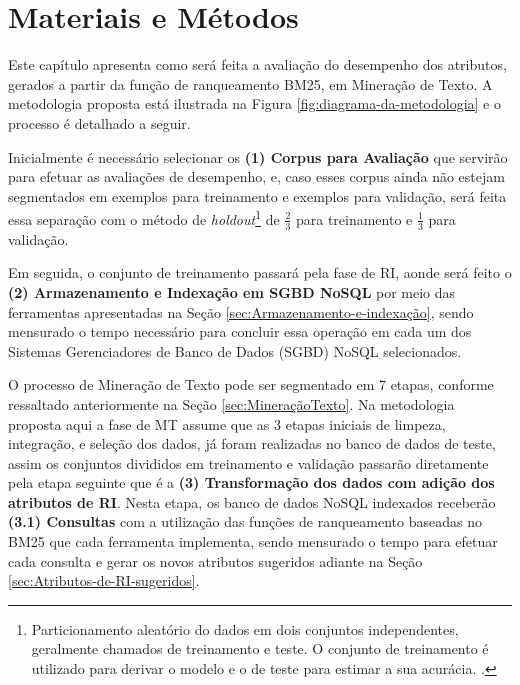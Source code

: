 \chapter{Materiais e Métodos} \label{ch:MateriaisMétodos} %
    Este capítulo apresenta como será feita a avaliação do desempenho dos atributos, gerados a partir da função de ranqueamento BM25, em Mineração de Texto.
    A metodologia proposta está ilustrada na Figura \ref{fig:diagrama-da-metodologia} e o processo é detalhado a seguir.
    
    
    
    Inicialmente é necessário selecionar os \textbf{(1) Corpus para Avaliação} que servirão para efetuar as avaliações de desempenho, e, caso esses corpus ainda não estejam segmentados em exemplos para treinamento e exemplos para validação, será feita essa separação com o método de \textit{holdout}\footnote{Particionamento aleatório do dados em dois conjuntos independentes, geralmente chamados de treinamento e teste. O conjunto de treinamento é utilizado para derivar o modelo e o de teste para estimar a sua acurácia. \cite[p.~370]{Han:2011:DMC:1972541}.} de $\frac{2}{3}$ para treinamento e $\frac{1}{3}$ para validação.
    
    Em seguida, o conjunto de treinamento passará pela fase de RI, aonde será feito o \textbf{(2) Armazenamento e Indexação em  SGBD NoSQL} por meio das ferramentas apresentadas na Seção  \ref{sec:Armazenamento-e-indexação}, sendo mensurado o tempo necessário para concluir essa operação em cada um dos Sistemas Gerenciadores de Banco de Dados (SGBD) NoSQL selecionados.
    
    O processo de Mineração de Texto pode ser segmentado em 7 etapas, conforme ressaltado anteriormente na Seção \ref{sec:MineraçãoTexto}.
    Na metodologia proposta aqui a fase de MT assume que as 3 etapas iniciais de limpeza, integração, e seleção dos dados, já foram realizadas no banco de dados de teste, assim os conjuntos divididos em treinamento e validação passarão diretamente pela etapa seguinte que é a \textbf{(3) Transformação dos dados com adição dos atributos de RI}.
    Nesta etapa, os banco de dados NoSQL indexados receberão \textbf{(3.1) Consultas} com a utilização das funções de ranqueamento baseadas no BM25 que cada ferramenta implementa, sendo mensurado o tempo para efetuar cada consulta e gerar os novos atributos sugeridos adiante na Seção \ref{sec:Atributos-de-RI-sugeridos}.
    

